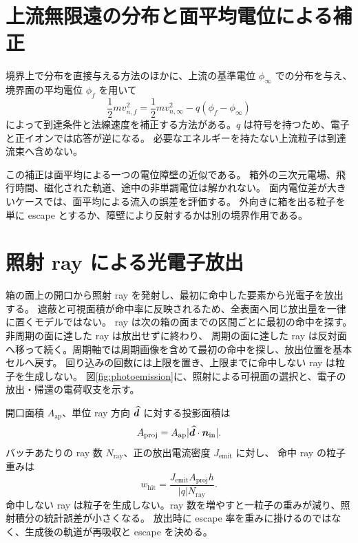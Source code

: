\section{上流無限遠の分布と面平均電位による補正}
境界上で分布を直接与える方法のほかに、上流の基準電位 $\phi_\infty$ での分布を与え、
境界面の平均電位 $\phi_f$ を用いて
\begin{equation}
 \frac12m v_{n,f}^2=\frac12m v_{n,\infty}^2-q(\phi_f-\phi_\infty)
 \label{eq:inflow_energy}
\end{equation}
によって到達条件と法線速度を補正する方法がある。$q$ は符号を持つため、電子と正イオンでは応答が逆になる。
必要なエネルギーを持たない上流粒子は到達流束へ含めない。

この補正は面平均による一つの電位障壁の近似である。
箱外の三次元電場、飛行時間、磁化された軌道、途中の非単調電位は解かれない。
面内電位差が大きいケースでは、面平均による流入の誤差を評価する。
外向きに箱を出る粒子を単に escape とするか、障壁により反射するかは別の境界作用である。

\section{照射 ray による光電子放出}
箱の面上の開口から照射 ray を発射し、最初に命中した要素から光電子を放出する。
遮蔽と可視面積が命中率に反映されるため、全表面へ同じ放出量を一律に置くモデルではない。
ray は次の箱の面までの区間ごとに最初の命中を探す。非周期の面に達した ray は放出せずに終わり、
周期の面に達した ray は反対面へ移って続く。周期軸では周期画像を含めて最初の命中を探し、放出位置を基本セルへ戻す。
回り込みの回数には上限を置き、上限までに命中しない ray は粒子を生成しない。
図\ref{fig:photoemission}に、照射による可視面の選択と、電子の放出・帰還の電荷収支を示す。



開口面積 $A_{\mathrm{ap}}$、単位 ray 方向 $\widehat{\bm{d}}$ に対する投影面積は
\begin{equation}
 A_{\mathrm{proj}}=A_{\mathrm{ap}}
 |\widehat{\bm{d}}\cdot\bm{n}_{\mathrm{in}}|.
\end{equation}
バッチあたりの ray 数 $N_{\mathrm{ray}}$、正の放出電流密度 $J_{\mathrm{emit}}$ に対し、
命中 ray の粒子重みは
\begin{equation}
 w_{\mathrm{hit}}=
 \frac{J_{\mathrm{emit}} A_{\mathrm{proj}}h}{|q|N_{\mathrm{ray}}}.
 \label{eq:ray_weight}
\end{equation}
命中しない ray は粒子を生成しない。ray 数を増やすと一粒子の重みが減り、照射積分の統計誤差が小さくなる。
放出時に escape 率を重みに掛けるのではなく、生成後の軌道が再吸収と escape を決める。

